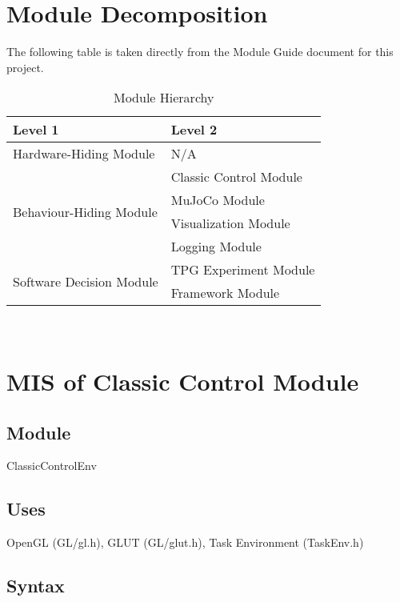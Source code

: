 \documentclass[12pt, titlepage]{article}
\begin{document}
\section{Module Decomposition}

The following table is taken directly from the Module Guide document for this project.

\begin{table}[h!]
  \centering
  \begin{tabular}{p{} p{}}
  \toprule
  \textbf{Level 1} & \textbf{Level 2}\\
  \midrule
  
  {Hardware-Hiding Module} & N/A \\
  \midrule
  
  \multirow{4}{0.3\textwidth}{Behaviour-Hiding Module} & Classic Control Module \\
  & MuJoCo Module\\
  & Visualization Module\\
  & Logging Module\\
  \midrule
  
  \multirow{2}{0.3\textwidth}{Software Decision Module} & {TPG Experiment Module}\\
  & Framework Module\\
  \bottomrule
  
  \end{tabular}
  \caption{Module Hierarchy}
  \label{TblMH}
  \end{table}

\newpage
~\newpage
\section{MIS of Classic Control Module} \label{ClassicControl Module}

\subsection{Module}
ClassicControlEnv

\subsection{Uses}
OpenGL (GL/gl.h), GLUT (GL/glut.h), Task Environment (TaskEnv.h)

\subsection{Syntax}
\end{document}
